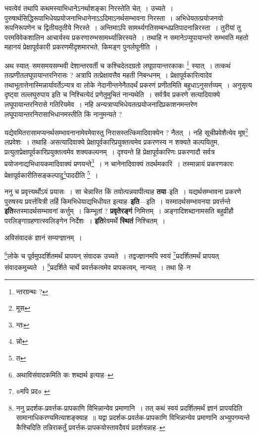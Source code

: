 \documentclass[article,12pt,a4paper]{memoir}
\begin{document}
	  \pstart भवत्वेवं तथापि कथमस्याभिधानेऽनर्थाशङ्का निरस्तेति चेत् । उच्यते । पुरुषार्थसिद्धिरूपाभिधेयप्रयोजनाभिधानेनाऽऽदिमाऽनर्थसम्भावना निरस्ता । अभिधेयतत्प्रयोजनयो रूपनिरूपणेन च द्वितीयतृतीये निरस्ते । अन्तिमाऽपि सामर्थ्यगतिसम्बन्धप्रतिपादनान्निरस्ता । तुरीयां तु परमविवेकशालिन आचार्यस्य प्रकरणारम्भसामर्थ्यान्निरस्यते । तथाहि न समानेऽप्युपायान्तरे सम्भवति महतो महानयं प्रेक्षापूर्वकारी प्रकरणमीदृशमारभते, किमङ्ग पुनर्लघूनीति ।
	\pend
      

	  \pstart अथ स्यात्--समसमयसम्भवी देशान्तरवर्ती च कश्चिदेतदग्रतो लघूपायान्तरकाकः \footnote{न्तरग्रन्थः ?} स्यात् । तत्कथं तत्प्रणीतलघूपायान्तरनिरासः ? अत्रापि तत्प्रेक्षावत्तैव महती निबन्धनम् । प्रेक्षापूर्वकारित्वादेव तथाभूतात्तेनास्मिन्नार्यावर्तेऽन्यत्र वा लोके नेदानीन्तनेनैतदर्थं प्रकरणं प्रणीतमिति बहुधाऽनुसर्त्तव्यम् । अनुसृत्य दृष्ट्वा तल्लघुरुपाय इति च निश्चित्येदं प्रणेतुमुचितं नान्यथेति । सर्वत्रैव प्रकरणे सत्यादिवाक्ये लघूपायान्तरनिरासे गतिरियमेव । नहि अन्यत्राप्यभिधेयतत्प्रयोजनादिप्रकाशनमन्तरेण लघूपायान्तरनिरासाभिधानमस्तीति किं नानुमन्यते ?
	\pend
      

	  \pstart यद्येवमितरासामप्यनर्थसम्भावनानामेवमेवास्तु निरासस्तत्किमादिवाक्येन ? नैतत् । नहि सूचीप्रवेशैत्येव मूष\footnote{मूस} लप्रवेशः । तथाहि--असत्यादिवाक्ये प्रेक्षापूर्वकारिप्रयुक्तत्वमेव प्रकरणस्य न शक्यते कल्पयितुम, प्रत्युताप्रेक्षापूर्वकारिप्रयुक्तत्वमेव शक्यकल्पनम् । दृश्यन्ते हि प्रेक्षापूर्वकारिणः प्रकरणादौ सर्वत्र प्रयोजनाद्यभिधायकमादिवाक्यं प्रणयन्ते\footnote{न्तः} । न चानेनादिवाक्यं तदर्थमकारि । तस्मान्नायं प्रकरणकारः प्रेक्षापूर्वकारीतिसङ्कल्पादु\footnote{न्नो}\-पाददीति \footnote{त} ।
	\pend
      

	  \pstart ननु च प्रवृत्त्यर्थोऽयं प्रयासः । सा चेन्नास्ति किं तयोत्पन्नयापीत्याह \textbf{तया}--इति । यद्यर्थसम्भावना प्रकरणे पुरुषस्य प्रवर्त्तयित्री तर्हि किमभिधेयाद्यभिधीयत इत्याह--\textbf{इति}—इति । यस्मादर्थसम्भावनया प्रवर्त्तन्ते \textbf{इति}स्तस्मादर्थसम्भावनां कर्त्तुम् । किम्भूतां ? \textbf{प्रवृतेरङ्गं} निमित्तम् । अङ्गादिशब्दानामसति बहुव्रीहौ परलिङ्गाग्रहणात्स्वलिङ्गेन निर्देशः । \textbf{इति}रेवमर्थे \textbf{स्थितं} निश्चितम् ।
	\pend
	  \bigskip
	  \begingroup
	

	  \pstart अविसंवादकं ज्ञानं सम्यग्ज्ञानम् ।
	\pend
       

	  \pstart \footnote{अथाविसंवादकमिति कः शब्दार्थ इत्याह--\cite{dp-msD-n}}\-लोके च पूर्वमुपदर्शितमर्थं प्रापयन् संवादक उच्यते । तद्वज्ज्ञानमपि स्वयं \footnote{०मपि प्रद० \cite{dp-msA} \cite{dp-msC} \cite{dp-msD} \cite{dp-edP} \cite{dp-edE}}\-प्रदर्शितमर्थं प्रापयत् संवादकमुच्यते । \footnote{ननु प्रदर्शक-प्रवर्त्तक-प्रापकाणि विभिन्नान्येव प्रमाणानि । तत् कथं स्वयं प्रदर्शितमर्थं ज्ञानं प्रापयदिति सामानाधिकरण्यमित्याशङ्क्याह ॥ यद्वा प्रदर्शक-प्रवर्तक-प्रापकाणि विभिन्नान्येव प्रमाणानि अभ्युपगम्यन्ते कैश्चिदिति तन्निराकर्तुं प्रवर्त्तक-प्रापकयोस्तावदैवयं प्रदर्शयन्नाह--\cite{dp-msD-n}}\-प्रदर्शिते चार्थे प्रवर्त्तकत्वमेव प्रापकत्वम्, नान्यत् । तथा हि--न
	\pend
      
\end{document}
